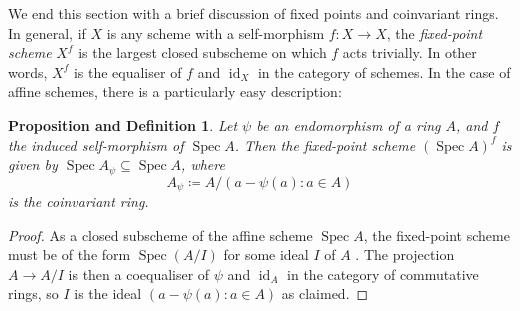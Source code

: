 \documentclass{amsart}
\newcommand{\id}{\operatorname{id}}
\newcommand{\Spec}{\operatorname{Spec}}
\theoremstyle{definition}
\theoremstyle{plain}
\newtheorem{propdef}[defn]{Proposition and Definition}
\theoremstyle{remark}
\begin{document}
We end this section with a brief discussion of fixed points and coinvariant rings. In general, if $X$ is any scheme with a self-morphism $f\colon X\to X$, the \emph{fixed-point scheme} $X^f$ is the largest closed subscheme on which $f$ acts trivially. In other words, $X^f$ is the equaliser of $f$ and $\id_X$ in the category of schemes. In the case of affine schemes, there is a particularly easy description:
\begin{propdef}
\label{prop:coinv_ring}
    Let $\psi$ be an endomorphism of a ring $A$, and $f$ the induced self-morphism of $\Spec A$. Then the fixed-point scheme $(\Spec A)^f$ is given by $\Spec A_\psi\subseteq \Spec A$, where 
    $$
        A_\psi\coloneqq A/(a - \psi(a) \colon a\in A)
    $$
    is the \emph{coinvariant ring}.
\end{propdef}
\begin{proof}
    As a closed subscheme of the affine scheme $\Spec A$, the fixed-point scheme must be of the form $\Spec (A/I)$ for some ideal $I$ of $A$ \cite[\href{https://stacks.math.columbia.edu/tag/01IF}{Tag 01IF}]{stacks-project}. The projection $A\to A/I$ is then a coequaliser of $\psi$ and $\id_A$ in the category of commutative rings, so $I$ is the ideal $(a-\psi(a)\colon a\in A)$ as claimed.
\end{proof}
\end{document}
